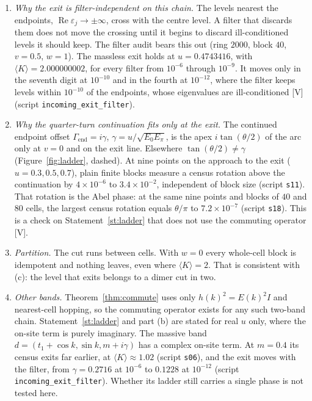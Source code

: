 \documentclass[11pt]{article}
\theoremstyle{definition}
\newcommand{\grade}[1]{\textsf{\small[#1]}}
\newcommand{\Rea}{\operatorname{Re}}
\begin{document}
\begin{enumerate}
\item \emph{Why the exit is filter-independent on this chain.} The levels nearest the endpoints, $\Rea\varepsilon_j\to\pm\infty$, cross with the centre level. A filter that discards them does not move the crossing until it begins to discard ill-conditioned levels it should keep. The filter audit bears this out (ring $2000$, block $40$, $v=0.5$, $w=1$). The massless exit holds at $u=0.4743416$, with $\langle K\rangle=2.000000002$, for every filter from $10^{-6}$ through $10^{-9}$. It moves only in the seventh digit at $10^{-10}$ and in the fourth at $10^{-12}$, where the filter keeps levels within $10^{-10}$ of the endpoints, whose eigenvalues are ill-conditioned \grade{V} (script \texttt{incoming\_exit\_filter}).
\item \emph{Why the quarter-turn continuation fits only at the exit.} The continued endpoint offset $\Gamma_{\mathrm{end}}=i\gamma$, $\gamma=u/\sqrt{E_0E_\pi}$, is the apex $i\tan(\theta/2)$ of the arc only at $v=0$ and on the exit line. Elsewhere $\tan(\theta/2)\ne\gamma$ (Figure~\ref{fig:ladder}, dashed). At nine points on the approach to the exit ($u=0.3,0.5,0.7$), plain finite blocks measure a census rotation above the continuation by $4\times10^{-6}$ to $3.4\times10^{-2}$, independent of block size (script \texttt{s11}). That rotation is the Abel phase: at the same nine points and blocks of $40$ and $80$ cells, the largest census rotation equals $\theta/\pi$ to $7.2\times10^{-7}$ (script \texttt{s18}). This is a check on Statement~\ref{st:ladder} that does not use the commuting operator \grade{V}.
\item \emph{Partition.} The cut runs between cells. With $w=0$ every whole-cell block is idempotent and nothing leaves, even where $\langle K\rangle=2$. That is consistent with (c): the level that exits belongs to a dimer cut in two.
\item \emph{Other bands.} Theorem~\ref{thm:commute} uses only $h(k)^2=E(k)^2I$ and nearest-cell hopping, so the commuting operator exists for any such two-band chain. Statement~\ref{st:ladder} and part (b) are stated for real $u$ only, where the on-site term is purely imaginary. The massive band $d=(t_1+\cos k,\sin k,m+i\gamma)$ has a complex on-site term. At $m=0.4$ its census exits far earlier, at $\langle K\rangle\approx1.02$ (script \texttt{s06}), and the exit moves with the filter, from $\gamma=0.2716$ at $10^{-6}$ to $0.1228$ at $10^{-12}$ (script \texttt{incoming\_exit\_filter}). Whether its ladder still carries a single phase is not tested here.
\end{enumerate}
\end{document}

